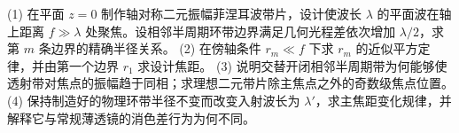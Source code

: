 (1) 在平面 \(z=0\) 制作轴对称二元振幅菲涅耳波带片，设计使波长 \(\lambda\) 的平面波在轴上距离 \(f\gg\lambda\) 处聚焦。设相邻半周期环带边界满足几何光程差依次增加 \(\lambda/2\)，求第 \(m\) 条边界的精确半径关系。
(2) 在傍轴条件 \(r_m\ll f\) 下求 \(r_m\) 的近似平方定律，并由第一个边界 \(r_1\) 求设计焦距。
(3) 说明交替开闭相邻半周期带为何能够使透射带对焦点的振幅趋于同相；求理想二元带片除主焦点之外的奇数级焦点位置。
(4) 保持制造好的物理环带半径不变而改变入射波长为 \(\lambda'\)，求主焦距变化规律，并解释它与常规薄透镜的消色差行为为何不同。

